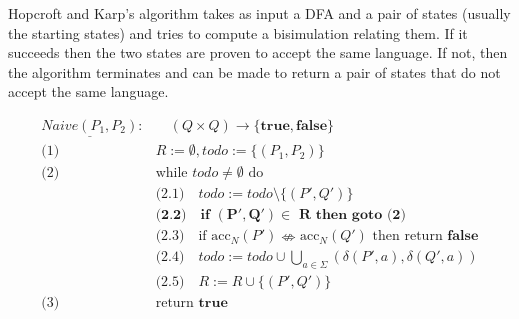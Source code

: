 Hopcroft and Karp's algorithm takes as input a DFA and a pair of states
(usually the starting states) and tries to compute a bisimulation
relating them.
If it succeeds then the two states are proven to accept the same language.
If not, then the algorithm terminates and can be made to return a pair
of states that do not accept the same language.

\begin{definition}
    \begin{align*}
        \underline{\mathit{Naive(P_1, P_2)}}: &\quad (Q \times Q) \to \{\mathbf{true}, \mathbf{false}\} \\
        \text{(1) } & R := \emptyset, \mathit{todo} := \{(P_1, P_2)\} \\
        \text{(2) } & \text{while } \mathit{todo} \neq \emptyset \text{ do}\\
        & \text{(2.1)}\quad \mathit{todo} := \mathit{todo} \setminus \{(P', Q')\}\\
        & \textbf{(2.2)}\quad \textbf{if } \mathbf{(P', Q') \in} \textbf{ R} \textbf{ then goto (2)}\\
        & \text{(2.3)}\quad \text{if } \text{acc}_N(P') \nLeftrightarrow \text{acc}_N(Q') \text{ then return } \mathbf{false}\\
        & \text{(2.4)}\quad \mathit{todo} := \mathit{todo} \cup \bigcup_{a \in \Sigma}{(\delta(P', a), \delta(Q', a))}\\
        & \text{(2.5)}\quad R := R \cup \{(P', Q')\} \\
        \text{(3) } & \text{return } \mathbf{true}\\
    \end{align*}
\end{definition}
